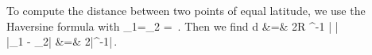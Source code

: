 \documentclass[preprint,12pt]{article}
\begin{document}
To compute the distance between two points of equal latitude, we use the Haversine formula with
\be
\vphi_1=\vphi_2 = \vphi\,.
\ee
Then we find
\bea
d &=&  2R \sin^{-1} \Big| \cos \vphi   \sin \Blp {}\Brp \Big|  \\
\Ra \quad |\lam_1 - \lam_2| &=& 2\left|\sin^{-1}\right|\,.
\eea
 





 


\end{document}
